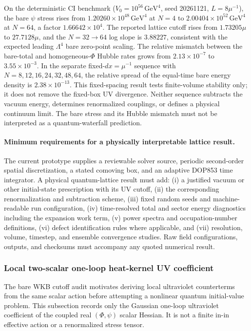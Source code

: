 \documentclass[epj]{svjour}
\begin{document}
On the deterministic CI benchmark ($V_0=10^{56}\,\mathrm{GeV}^4$, seed
20261121, $L=8\mu^{-1}$), the bare $\psi$ stress rises from
$1.20260\times10^{48}\,\mathrm{GeV}^4$ at $N=4$ to
$2.00404\times10^{52}\,\mathrm{GeV}^4$ at $N=64$, a factor
$1.66642\times10^4$. The reported lattice cutoff rises from
$1.73205\mu$ to $27.7128\mu$, and the $N=32\to64$ log slope is
$3.88227$, consistent with the expected leading $\Lambda^4$ bare
zero-point scaling. The relative mismatch between the bare-total and
homogeneous-$\Phi$ Hubble rates grows from $2.13\times10^{-7}$ to
$3.55\times10^{-3}$. In the separate fixed-$dx=\mu^{-1}$ sequence
with $N=8,12,16,24,32,48,64$, the relative spread of the equal-time
bare energy density is $2.38\times10^{-13}$. This fixed-spacing result
tests finite-volume stability only; it does not remove the fixed-box
UV divergence. Neither sequence subtracts the vacuum energy, determines
renormalized couplings, or defines a physical continuum limit. The bare stress and its Hubble
mismatch must not be interpreted as a quantum-waterfall prediction.

\paragraph{Minimum requirements for a physically interpretable lattice result.}
The current prototype supplies a reviewable solver source, periodic
second-order spatial discretization, a stated comoving box, and an
adaptive DOP853 time integrator. A physical quantum-lattice result must
add: (i) a justified vacuum or other initial-state prescription with
its UV cutoff, (ii) the corresponding renormalization and subtraction
scheme, (iii) fixed random seeds and machine-readable run configuration,
(iv) time-resolved total and sector energy diagnostics including the
expansion work term, (v) power spectra and occupation-number definitions,
(vi) defect identification rules where applicable, and (vii)
resolution, volume, timestep, and ensemble convergence studies. Raw
field configurations, outputs, and checksums must accompany any quoted
numerical result.



\subsubsection{Local two-scalar one-loop heat-kernel UV coefficient}
\label{sec:ptum_scalar_one_loop_uv}

The bare WKB cutoff audit motivates deriving local ultraviolet counterterms
from the same scalar action before attempting a nonlinear quantum
initial-value problem. This subsection records only the Gaussian
one-loop ultraviolet coefficient of the coupled real $(\Phi,\psi)$
scalar Hessian. It is not a finite in-in effective action or a
renormalized stress tensor.
\end{document}
